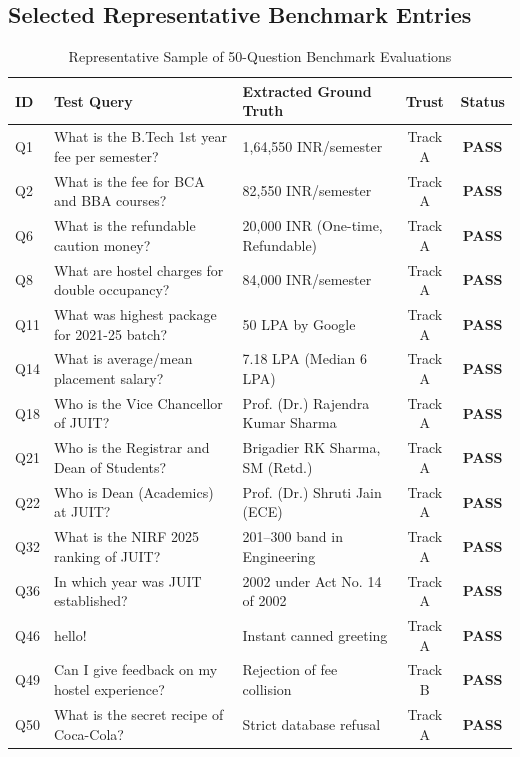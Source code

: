 \documentclass[11pt,a4paper]{article}
\begin{document}
\subsection{Selected Representative Benchmark Entries}
\begin{table}[H]
    \centering
    \footnotesize
    \begin{tabular}{@{}lp{5.5cm}p{4.5cm}cc@{}}
        \toprule
        \textbf{ID} & \textbf{Test Query} & \textbf{Extracted Ground Truth} & \textbf{Trust} & \textbf{Status} \\ \midrule
        Q1 & What is the B.Tech 1st year fee per semester? & 1,64,550 INR/semester & Track A & \textcolor{passgreen}{\textbf{PASS}} \\
        Q2 & What is the fee for BCA and BBA courses? & 82,550 INR/semester & Track A & \textcolor{passgreen}{\textbf{PASS}} \\
        Q6 & What is the refundable caution money? & 20,000 INR (One-time, Refundable) & Track A & \textcolor{passgreen}{\textbf{PASS}} \\
        Q8 & What are hostel charges for double occupancy? & 84,000 INR/semester & Track A & \textcolor{passgreen}{\textbf{PASS}} \\
        Q11 & What was highest package for 2021-25 batch? & 50 LPA by Google & Track A & \textcolor{passgreen}{\textbf{PASS}} \\
        Q14 & What is average/mean placement salary? & 7.18 LPA (Median 6 LPA) & Track A & \textcolor{passgreen}{\textbf{PASS}} \\
        Q18 & Who is the Vice Chancellor of JUIT? & Prof. (Dr.) Rajendra Kumar Sharma & Track A & \textcolor{passgreen}{\textbf{PASS}} \\
        Q21 & Who is the Registrar and Dean of Students? & Brigadier RK Sharma, SM (Retd.) & Track A & \textcolor{passgreen}{\textbf{PASS}} \\
        Q22 & Who is Dean (Academics) at JUIT? & Prof. (Dr.) Shruti Jain (ECE) & Track A & \textcolor{passgreen}{\textbf{PASS}} \\
        Q32 & What is the NIRF 2025 ranking of JUIT? & 201--300 band in Engineering & Track A & \textcolor{passgreen}{\textbf{PASS}} \\
        Q36 & In which year was JUIT established? & 2002 under Act No. 14 of 2002 & Track A & \textcolor{passgreen}{\textbf{PASS}} \\
        Q46 & hello! & Instant canned greeting & Track A & \textcolor{passgreen}{\textbf{PASS}} \\
        Q49 & Can I give feedback on my hostel experience? & Rejection of fee collision & Track B & \textcolor{passgreen}{\textbf{PASS}} \\
        Q50 & What is the secret recipe of Coca-Cola? & Strict database refusal & Track A & \textcolor{passgreen}{\textbf{PASS}} \\ \bottomrule
    \end{tabular}
    \caption{Representative Sample of 50-Question Benchmark Evaluations}
    \label{tab:sample_qna}
\end{table}
\end{document}
